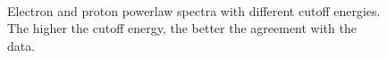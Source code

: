 \documentclass[a4paper]{article}
\begin{document}
\begin{figure}[H]
{\begin{subfigure}[b]{.65\textwidth}
	\end{subfigure}%
	}\\
\caption{Electron and proton powerlaw spectra with different cutoff energies. The higher the cutoff energy, the better the agreement with the data.}
\label{Cutoff_energies}
\end{figure}
\end{document}
